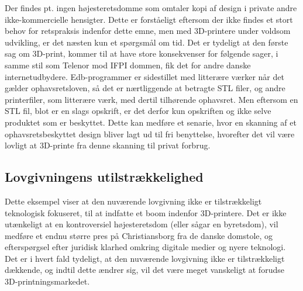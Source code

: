 Der findes pt. ingen højesteretsdomme som omtaler kopi af design i private andre ikke-kommercielle hensigter\cite{jura5}. Dette er forståeligt eftersom der ikke findes et stort behov for retspraksis indenfor dette emne, men med 3D-printere under voldsom udvikling, er det næsten kun et spørgsmål om tid. Det er tydeligt at den første sag om 3D-print, kommer til at have store konsekvenser for følgende sager, i samme stil som Telenor mod IFPI dommen, fik det for andre danske internetudbydere\cite{jura6}.
Edb-programmer er sidestillet med litterære værker når det gælder ophavsretsloven\cite{jura7}, så det er nærtliggende at betragte STL filer, og andre printerfiler, som litterære værk, med dertil tilhørende ophavsret. Men eftersom en STL fil, blot er en slags opskrift, er det derfor kun opskriften og ikke selve produktet som er beskyttet. Dette kan medføre et senarie, hvor en skanning af et ophavsretsbeskyttet design bliver lagt ud til fri benyttelse, hvorefter det vil være lovligt at 3D-printe fra denne skanning til privat forbrug.

\subsection{Lovgivningens utilstrækkelighed}
 
Dette eksempel viser at den nuværende lovgivning ikke er tilstrækkeligt teknologisk fokuseret, til at indfatte et boom indenfor 3D-printere. Det er ikke utænkeligt at en kontroversiel højesteretsdom (eller sågar en byretsdom), vil medføre et endnu større pres på Christiansborg fra de danske domstole, og efterspørgsel efter juridisk klarhed omkring digitale medier og nyere teknologi.
Det er i hvert fald tydeligt, at den nuværende lovgivning ikke er tilstrækkeligt dækkende, og indtil dette ændrer sig, vil det være meget vanskeligt at forudse 3D-printningsmarkedet.
